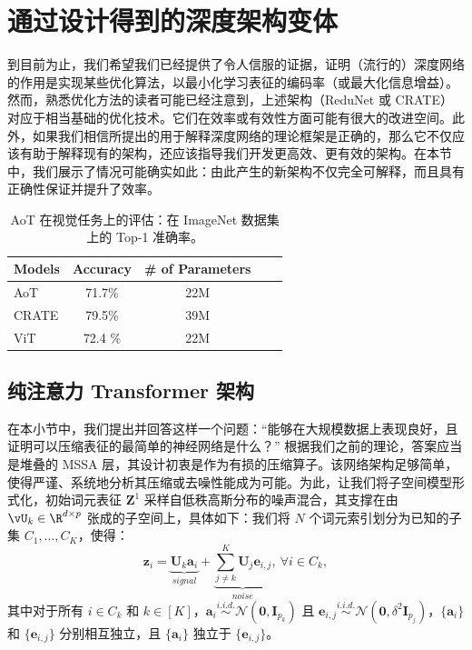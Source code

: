 \documentclass[../../book-main_zh.tex]{subfiles}
\begin{document}
\section{通过设计得到的深度架构变体}
\label{sec:chap4-derive-white-box-transformer-variants}

到目前为止，我们希望我们已经提供了令人信服的证据，证明（流行的）深度网络的作用是实现某些优化算法，以最小化学习表征的编码率（或最大化信息增益）。然而，熟悉优化方法的读者可能已经注意到，上述架构（ReduNet 或 CRATE）对应于相当基础的优化技术。它们在效率或有效性方面可能有很大的改进空间。此外，如果我们相信所提出的用于解释深度网络的理论框架是正确的，那么它不仅应该有助于解释现有的架构，还应该指导我们开发更高效、更有效的架构。在本节中，我们展示了情况可能确实如此：由此产生的新架构不仅完全可解释，而且具有正确性保证并提升了效率。

\begin{table}[!t]
    \caption{AoT 在视觉任务上的评估：在 ImageNet 数据集上的 Top-1 准确率。}
    \centering
    \begin{tabular}{lcccc}
        \toprule
        Models & Accuracy  & \# of Parameters \\
        \midrule
        \midrule
        AoT   & 71.7\% & 22M \\
        CRATE & 79.5\%  & 39M  \\
        ViT & 72.4 \% & 22M \\
        \bottomrule
    \end{tabular}
    \label{tab:aot_vision}
\end{table}

\subsection{纯注意力 Transformer 架构} \label{sub:aot}
在本小节中，我们提出并回答这样一个问题：“能够在大规模数据上表现良好，且证明可以压缩表征的最简单的神经网络是什么？”
根据我们之前的理论，答案应当是堆叠的 MSSA 层，其设计初衷是作为有损的压缩算子。该网络架构足够简单，使得严谨、系统地分析其压缩或去噪性能成为可能。为此，让我们将子空间模型形式化，初始词元表征 $\bm Z^{1}$ 采样自低秩高斯分布的噪声混合，其支撑在由 \(\vU_{k} \in \R^{d \times p}\) 张成的子空间上，具体如下：我们将 \(N\) 个词元索引划分为已知的子集 \(C_{1}, \dots, C_{K}\)，使得：
\begin{equation}\label{def:MoG}
    \bm z_i = \underbrace{\bm U_{k} \bm a_i}_{signal} +
    \underbrace{\sum_{j \neq k}^K \bm U_j \bm e_{i,j}}_{
    noise},\ \forall i \in C_k,
\end{equation}
其中对于所有 $i \in C_k$ 和 $k \in [K]$，$\bm{a}_i \overset{i.i.d.}{\sim} \mathcal{N}(\bm{0},\bm{I}_{p_k})$ 且 $\bm{e}_{i,j} \overset{i.i.d.}{\sim} \mathcal{N}(\bm{0},\delta^2\bm{I}_{p_j})$，$\{\bm{a}_i\}$ 和 $\{\bm{e}_{i,j}\}$ 分别相互独立，且 $\{\bm{a}_i\}$ 独立于 $\{\bm{e}_{i,j}\}$。
\end{document}

